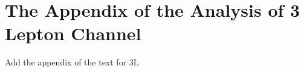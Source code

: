 \section{The Appendix of the Analysis of 3 Lepton Channel }
\label{sec:AppAnaThreeL}
Add the appendix of the text for 3L


